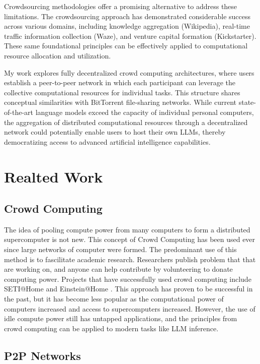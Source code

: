 \documentclass[preprint,twoside,11pt]{article}
\begin{document}
Crowdsourcing methodologies offer a promising alternative to address these limitations.
The crowdsourcing approach has demonstrated considerable success across various domains, including knowledge aggregation (Wikipedia),
real-time traffic information collection (Waze), and venture capital formation (Kickstarter).
These same foundational principles can be effectively applied to computational resource allocation and utilization.

My work explores fully decentralized crowd computing architectures,
where users establish a peer-to-peer network in which each participant can leverage the collective computational resources for individual tasks.
This structure shares conceptual similarities with BitTorrent file-sharing networks.
While current state-of-the-art language models exceed the capacity of individual personal computers,
the aggregation of distributed computational resources through a decentralized network could potentially enable users to host their own LLMs,
thereby democratizing access to advanced artificial intelligence capabilities.
\section{Realted Work}

\subsection{Crowd Computing}

The idea of pooling compute power from many computers to form a distributed supercomputer is not new. This concept of Crowd Computing
has been used ever since large networks of computer were formed. The predominant use of this method is to fascilitate academic research.
Researchers publish problem that that are working on, and anyone can help contribute by volunteering to donate computing power.
Projects that have successfully used crowd computing include SETI@Home \citep{10.1145/581571.581573} and Einstein@Home \citep{Steltner_2021}.
This approach has proven to be successful in the past, but it has become less popular as the computational power of computers increased and access to supercomputers increased.
However, the use of idle compute power still has untapped applications, and the principles from crowd computing can be applied to modern tasks like LLM inference.

\subsection{P2P Networks}
\end{document}
